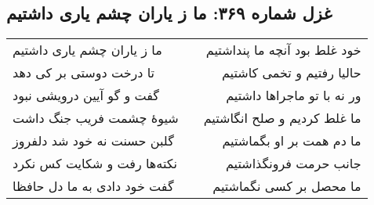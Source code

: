 \begin{center}
\section*{غزل شماره ۳۶۹: ما ز یاران چشم یاری داشتیم}
\label{sec:sh369}
\begin{longtable}{l p{0.5cm} r}
ما ز یاران چشم یاری داشتیم
&&
خود غلط بود آنچه ما پنداشتیم
\\
تا درخت دوستی بر کی دهد
&&
حالیا رفتیم و تخمی کاشتیم
\\
گفت و گو آیین درویشی نبود
&&
ور نه با تو ماجراها داشتیم
\\
شیوهٔ چشمت فریب جنگ داشت
&&
ما غلط کردیم و صلح انگاشتیم
\\
گلبن حسنت نه خود شد دلفروز
&&
ما دم همت بر او بگماشتیم
\\
نکته‌ها رفت و شکایت کس نکرد
&&
جانب حرمت فرونگذاشتیم
\\
گفت خود دادی به ما دل حافظا
&&
ما محصل بر کسی نگماشتیم
\\
\end{longtable}
\end{center}
